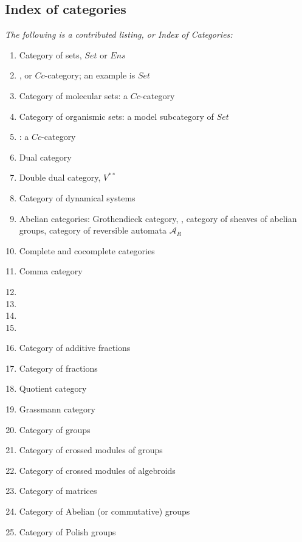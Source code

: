 \documentclass[12pt]{article}
\theoremstyle{plain}
\theoremstyle{definition}
\numberwithin{equation}{section}
\begin{document}
\subsection{Index of categories}
\emph{The following is a contributed listing, or Index of Categories:}

\begin{enumerate}
\item Category of sets, $Set$ or $Ens$
\item {}, or $Cc$-category; an example is
$Set$
\item Category of molecular sets: a $Cc$-category
\item Category of organismic sets: a model subcategory of $Set$
\item {}: a $Cc$-category
\item Dual category
\item Double dual category, $V^{**}$
\item Category of dynamical systems
\item Abelian categories: Grothendieck category, , category of sheaves of abelian groups, category of reversible automata
$\mathcal{A}_R$
\item Complete and cocomplete categories
\item Comma category
\item {}
\item {}
\item {}
\item {}
\item Category of additive fractions
\item Category of fractions
\item Quotient category
\item Grassmann category
\item Category of groups
\item Category of crossed modules of groups
\item Category of crossed modules of algebroids
\item Category of matrices
\item Category of Abelian (or commutative) groups
\item Category of Polish groups

\end{enumerate}
\end{document}
